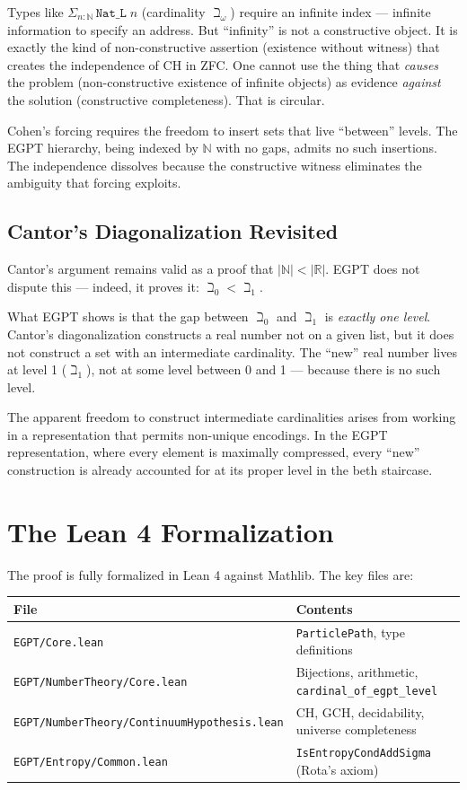 \documentclass{report}
\begin{document}
Types like $\Sigma_{n : \mathbb{N}}\, \texttt{Nat\_L}\; n$ (cardinality
$\beth_\omega$) require an infinite index --- infinite information to specify
an address. But ``infinity'' is not a constructive object. It is exactly the
kind of non-constructive assertion (existence without witness) that creates
the independence of CH in ZFC. One cannot use the thing that \emph{causes}
the problem (non-constructive existence of infinite objects) as evidence
\emph{against} the solution (constructive completeness). That is circular.

Cohen's forcing requires the freedom to insert sets that live ``between''
levels. The EGPT hierarchy, being indexed by $\mathbb{N}$ with no gaps, admits
no such insertions. The independence dissolves because the constructive witness
eliminates the ambiguity that forcing exploits.

\subsection{Cantor's Diagonalization Revisited}

Cantor's argument remains valid as a proof that $|\mathbb{N}| < |\mathbb{R}|$.
EGPT does not dispute this --- indeed, it proves it: $\beth_0 < \beth_1$.

What EGPT shows is that the gap between $\beth_0$ and $\beth_1$ is
\emph{exactly one level}. Cantor's diagonalization constructs a real number
not on a given list, but it does not construct a set with an intermediate
cardinality. The ``new'' real number lives at level 1 ($\beth_1$), not at
some level between 0 and 1 --- because there is no such level.

The apparent freedom to construct intermediate cardinalities arises from
working in a representation that permits non-unique encodings. In the EGPT
representation, where every element is maximally compressed, every ``new''
construction is already accounted for at its proper level in the beth staircase.

\section{The Lean 4 Formalization}

The proof is fully formalized in Lean 4 against Mathlib. The key files are:

\begin{center}
\begin{tabular}{ll}
\textbf{File} & \textbf{Contents} \\
\hline
\texttt{EGPT/Core.lean} & \texttt{ParticlePath}, type definitions \\
\texttt{EGPT/NumberTheory/Core.lean} & Bijections, arithmetic, \texttt{cardinal\_of\_egpt\_level} \\
\texttt{EGPT/NumberTheory/ContinuumHypothesis.lean} & CH, GCH, decidability, universe completeness \\
\texttt{EGPT/Entropy/Common.lean} & \texttt{IsEntropyCondAddSigma} (Rota's axiom) \\
\end{tabular}
\end{center}
\end{document}
